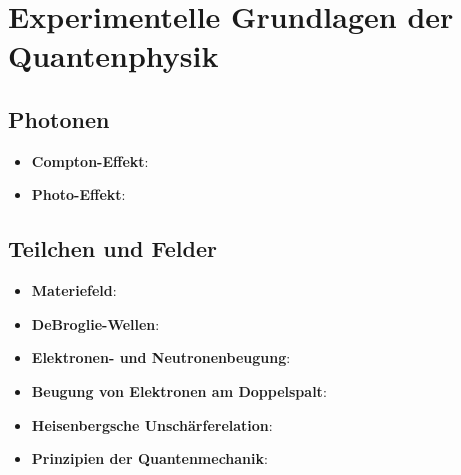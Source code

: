 \section{Experimentelle Grundlagen der Quantenphysik}%
\label{quant:sec:experimentelle_grundlagen_der_quantenphysik}

\subsection{Photonen}%
\label{quant:sub:photonen}

\begin{itemize}
	\item \textbf{Compton-Effekt}:
	\item \textbf{Photo-Effekt}:
\end{itemize}

\subsection{Teilchen und Felder}%
\label{quant:sub:teilchen_und_felder}

\begin{itemize}
	\item \textbf{Materiefeld}:
	\item \textbf{DeBroglie-Wellen}:
	\item \textbf{Elektronen- und Neutronenbeugung}:
	\item \textbf{Beugung von Elektronen am Doppelspalt}:
	\item \textbf{Heisenbergsche Unschärferelation}:
	\item \textbf{Prinzipien der Quantenmechanik}:
\end{itemize}